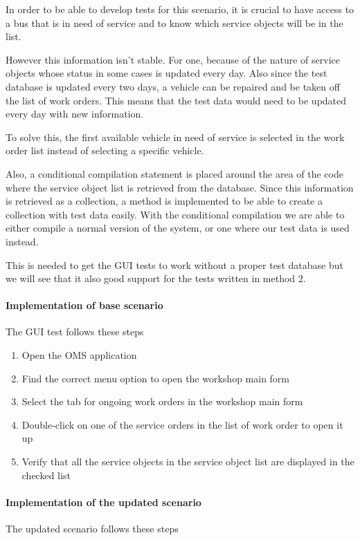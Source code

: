 \documentclass{article}
\begin{document}
				In order to be able to develop tests for this scenario, it is crucial to have access to a bus that is in need of service and to know which service objects will be in the list. 

				However this information isn’t stable. For one, because of the nature of service objects whose status in some cases is updated every day. Also since the test database is updated every two days, a vehicle can be repaired and be taken off the list of work orders. This means that the test data would need to be updated every day with new information.

				To solve this, the first available vehicle in need of service is selected in the work order list instead of selecting a specific vehicle. 

				Also, a conditional compilation statement is placed around the area of the code where the service object list is retrieved from the database. Since this information is retrieved as a collection, a method is implemented to be able to create a collection with test data easily. With the conditional compilation we are able to either compile a normal version of the system, or one where our test data is used instead. 

				This is needed to get the GUI tests to work without a proper test database but we will see that it also good support for the tests written in method 2.

				\paragraph{Implementation of base scenario}
				
				The GUI test follows these steps
			
				\begin{enumerate}
					\item Open the OMS application
					\item Find the correct menu option to open the workshop main form
					\item Select the tab for ongoing work orders in the workshop main form
					\item Double-click on one of the service orders in the list of work order to open it up
					\item Verify that all the service objects in the service object list are displayed in the checked list 
				\end{enumerate}

				\paragraph{Implementation of the updated scenario}
				The updated scenario follows these steps
\end{document}
